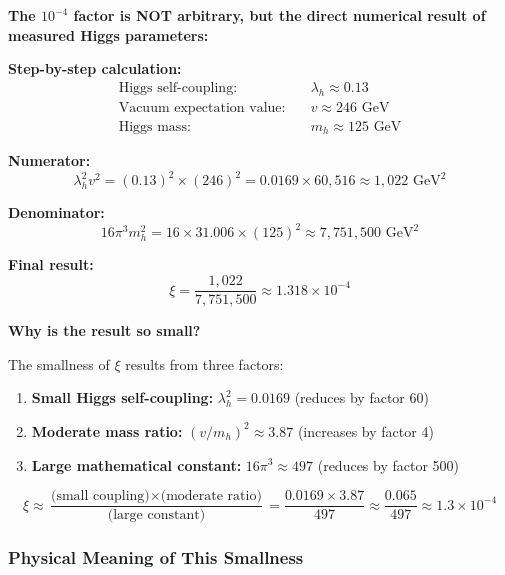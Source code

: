 \documentclass[12pt,a4paper]{article}
\begin{document}
\textbf{The $10^{-4}$ factor is NOT arbitrary, but the direct numerical result of measured Higgs parameters:}

\textbf{Step-by-step calculation:}
\begin{align}
	\text{Higgs self-coupling:} \quad &\lambda_h \approx 0.13 \\
	\text{Vacuum expectation value:} \quad &v \approx 246 \text{ GeV} \\
	\text{Higgs mass:} \quad &m_h \approx 125 \text{ GeV}
\end{align}

\textbf{Numerator:} 
\begin{equation}
	\lambda_h^2 v^2 = (0.13)^2 \times (246)^2 = 0.0169 \times 60,516 \approx 1,022 \text{ GeV}^2
\end{equation}

\textbf{Denominator:}
\begin{equation}
	16\pi^3 m_h^2 = 16 \times 31.006 \times (125)^2 \approx 7,751,500 \text{ GeV}^2
\end{equation}

\textbf{Final result:}
\begin{equation}
	\xi = \frac{1,022}{7,751,500} \approx 1.318 \times 10^{-4}
\end{equation}

\textbf{Why is the result so small?}

The smallness of $\xi$ results from three factors:
\begin{enumerate}
	\item \textbf{Small Higgs self-coupling:} $\lambda_h^2 = 0.0169$ (reduces by factor 60)
	\item \textbf{Moderate mass ratio:} $(v/m_h)^2 \approx 3.87$ (increases by factor 4)
	\item \textbf{Large mathematical constant:} $16\pi^3 \approx 497$ (reduces by factor 500)
\end{enumerate}

\begin{equation}
	\xi \approx \frac{\text{(small coupling)} \times \text{(moderate ratio)}}{\text{(large constant)}} = \frac{0.0169 \times 3.87}{497} \approx \frac{0.065}{497} \approx 1.3 \times 10^{-4}
\end{equation}

\subsubsection{Physical Meaning of This Smallness}
\label{subsubsec:physical_meaning_smallness}
\end{document}
